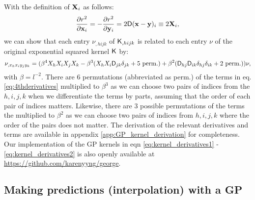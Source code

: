 With the definition of ${\bf X}_i$ as follows:
\begin{equation}
	\frac{\partial r^2}{\partial \mathbf{x}_i} = -\frac{\partial
	r^2}{\partial \mathbf{y}_i} =
	2 \mathsf{D}(\mathbf{x} - \mathbf{y})_i \equiv 2{\bf X}_i,
\end{equation}
we can show that each entry $\nu_{,hijk}$ of $\mathsf{K}_{,hijk}$ is
related to each entry $\nu$ of the original exponential squared kernel
$\mathsf{K}$ by:
\begin{equation}
\nu_{,x_h x_i y_j y_k} = (\beta^4 X_h X_i X_j X_k -
\beta^3 (X_h X_i \mathsf{D}_{jk} \delta_{jk} + 5~{\rm perm.}) + \beta^2
(\mathsf{D}_{hj} \mathsf{D}_{ik}\delta_{hj}\delta_{ik} + 2~{\rm perm.})) \nu,
\label{eq:4thderivatives}
\end{equation}
with $\beta = l^{-2}$. There are 6 permutations (abbreviated as perm.) of the terms in
eq. \ref{eq:4thderivatives}
multiplied to $\beta^3$ as we can choose two pairs of indices from the $h,i,j,k$ 
when we differentiate the terms by parts, assuming that the order of each
pair of indices matters. 
Likewise, there are 3 possible permutations of
the terms the multiplied to $\beta^2$ as we can choose two pairs of indices from
$h, i, j, k$ where the order of the pairs does not matter.
The derivation of the relevant derivatives and terms are available 
in appendix \ref{app:GP_kernel_derivation} for completeness. 
Our implementation of the GP kernels in eqn \ref{eq:kernel_derivatives1} - 
\ref{eq:kernel_derivatives2} is also openly available at
\href{https://github.com/karenyyng/george}{https://github.com/karenyyng/george}.

\subsection{Making predictions (interpolation) with a GP}

